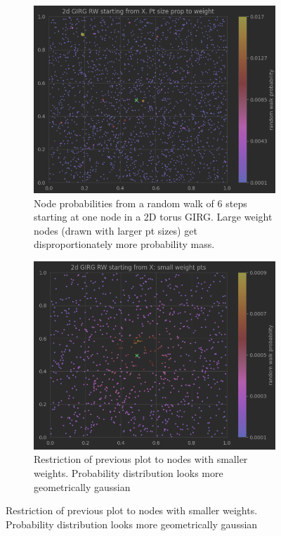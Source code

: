 \begin{figure}
  \centering

  \begin{subfigure}{0.49\textwidth}
    \centering
    \includegraphics[width=\linewidth]{figures/2d_GIRG_RW.png}
    \caption{Node probabilities from a random walk of 6 steps starting at one node in a 2D torus GIRG. Large weight nodes (drawn with larger pt sizes) get disproportionately more probability mass.}
  \end{subfigure}
  \hfill
  \begin{subfigure}{0.49\textwidth}
    \centering
    \includegraphics[width=\linewidth]{figures/2d_GIRG_RW_small_weights.png}
    \caption{Restriction of previous plot to nodes with smaller weights. Probability distribution looks more geometrically gaussian}
  \end{subfigure}


\end{figure}
